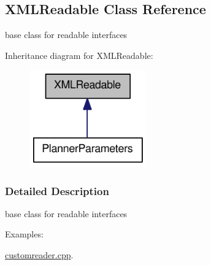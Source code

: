 \hypertarget{classOpenRAVE_1_1XMLReadable}{
\subsection{XMLReadable Class Reference}
\label{classOpenRAVE_1_1XMLReadable}
}


base class for readable interfaces  




Inheritance diagram for XMLReadable:\nopagebreak
\begin{figure}[H]
\begin{center}
\leavevmode
\includegraphics[width=142pt]{classOpenRAVE_1_1XMLReadable__inherit__graph}
\end{center}
\end{figure}


\subsubsection{Detailed Description}
base class for readable interfaces \begin{Desc}
\item[Examples: ]\par


\hyperlink{customreader_8cpp-example}{customreader.cpp}.

\end{Desc}
